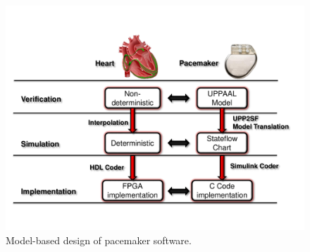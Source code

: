 \documentclass[a4paper]{article}
\begin{document}
\newpage
\begin{figure}[t]
	\centering
	\includegraphics[scale=0.45]{figs/model_based_b.pdf}
	\caption{\small Model-based design of pacemaker software.}
	\label{fig:MBD}
\end{figure}
\end{document}
